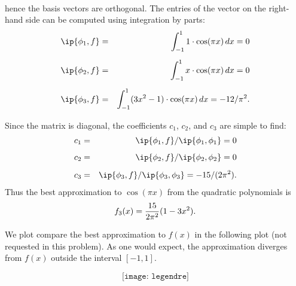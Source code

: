 {\begin{solution}
\begin{eqnarray*}
\end{eqnarray*}
hence the basis vectors are orthogonal.
The entries of the vector on the right-hand side can be computed 
using integration by parts:
\begin{eqnarray*}
  \ip{\phi_1,f} &=& \int_{-1}^1 1\cdot\cos(\pi x)\,dx = 0 \\[0.5em]
  \ip{\phi_2,f} &=& \int_{-1}^1 x\cdot\cos(\pi x)\,dx = 0 \\[0.5em]
  \ip{\phi_3,f} &=& \int_{-1}^1 (3x^2-1)\cdot\cos(\pi x)\,dx = -12/\pi^2.\\[0.5em]
\end{eqnarray*}
Since the matrix is diagonal, the coefficients $c_1$, $c_2$, and $c_3$ are simple to find:
\begin{eqnarray*}
    c_1 &=& \ip{\phi_1,f}/\ip{\phi_1,\phi_1} = 0 \\[0.5em]
    c_2 &=& \ip{\phi_2,f}/\ip{\phi_2,\phi_2} = 0 \\[0.5em]
    c_3 &=& \ip{\phi_3,f}/\ip{\phi_3,\phi_3} = -15/(2\pi^2).
\end{eqnarray*}
Thus the best approximation to $\cos(\pi x)$ from the quadratic polynomials is
\[ f_3(x) = {15\over 2\pi^2} (1-3x^2).\]

We plot compare the best approximation to $f(x)$ in the following plot
(not requested in this problem).  As one would expect, the approximation 
diverges from $f(x)$ outside the interval $[-1,1]$.

\begin{equation} \texttt{[image: legendre]} \end{equation}

\end{solution}}{}

